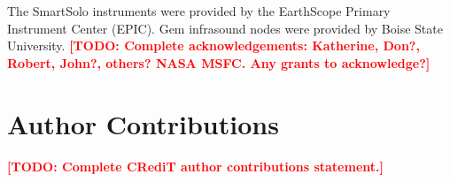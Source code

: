 \documentclass[]{seismica}
\newcommand{\todo}[1]{\textcolor{red}{\textbf{[TODO: #1]}}}
\begin{document}
\begin{acknowledgements}
The SmartSolo instruments were provided by the EarthScope Primary
Instrument Center (EPIC). Gem infrasound nodes were provided by Boise
State University. \todo{Complete acknowledgements: Katherine, Don?,
Robert, John?, others? NASA MSFC. Any grants to acknowledge?}
\end{acknowledgements}

\section*{Author Contributions}

\todo{Complete CRediT author contributions statement.}

\end{document}
